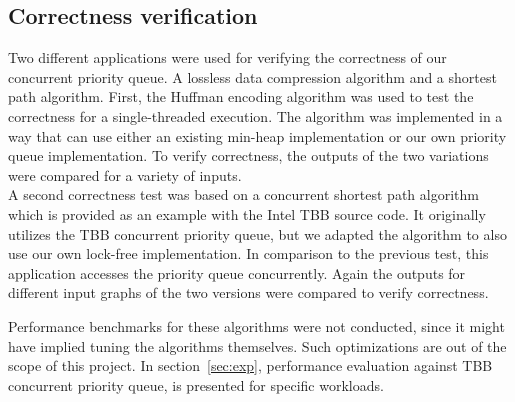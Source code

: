 
\subsection{Correctness verification}
\label{subsec:corr_ver}
Two different applications were used for verifying the correctness of our concurrent priority queue.
A lossless data compression algorithm and a shortest path algorithm. 
First, the Huffman encoding algorithm was used to test the correctness for a single-threaded execution. The algorithm was implemented in a way that can use either an existing min-heap implementation or our own priority queue implementation.
To verify correctness, the outputs of the two variations were compared for a variety of inputs.\\
A second correctness test was based on a concurrent shortest path algorithm which is provided as an example with the Intel TBB source code.
It originally utilizes the TBB concurrent priority queue, but we adapted the algorithm to also use our own lock-free implementation.
In comparison to the previous test, this application accesses the priority queue concurrently.
Again the outputs for different input graphs of the two versions were compared to verify correctness.

Performance benchmarks for these algorithms were not conducted, since it might have implied tuning the algorithms themselves.
Such optimizations are out of the scope of this project.
In section~\ref{sec:exp}, performance evaluation against TBB concurrent priority queue, is presented for specific workloads.

